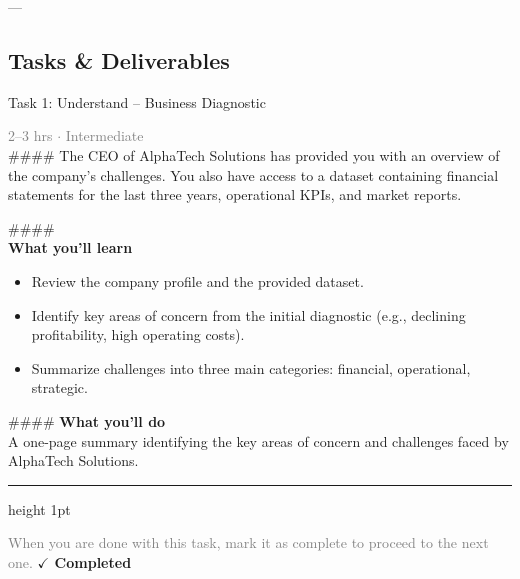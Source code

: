 \documentclass[10pt,a4paper]{article}
\begin{document}
---

\subsection*{Tasks \& Deliverables}

\begin{taskbox}{Task 1: Understand – Business Diagnostic}

    {\small \textcolor{gray}{2--3 hrs $\cdot$ Intermediate}}\\[12pt]

    \#\#\#\#   
The CEO of AlphaTech Solutions has provided you with an overview of the company’s challenges. You also have access to a dataset containing financial statements for the last three years, operational KPIs, and market reports.  

\#\#\#\# \\[10pt]
\vspace{8pt}
{\large \textbf{\textcolor{brandLight}{What you'll learn}}}\\[4pt]  
\begin{itemize}
    \item Review the company profile and the provided dataset.  
    \item Identify key areas of concern from the initial diagnostic (e.g., declining profitability, high operating costs).  
    \item Summarize challenges into three main categories: financial, operational, strategic.  
\end{itemize}

\#\#\#\# \vspace{8pt}
{\large \textbf{\textcolor{brandLight}{What you'll do}}}\\[4pt]  
A one-page summary identifying the key areas of concern and challenges faced by AlphaTech Solutions.\par

    \vspace{16pt}

    \textcolor{cardBorder}{\hrule height 1pt}\vspace{8pt}

    \small \textcolor{gray}{When you are done with this task, mark it as complete to proceed to the next one.} \hfill \textbf{\textcolor{brandDark}{$\checkmark$ Completed}}

\end{taskbox}
\end{document}
